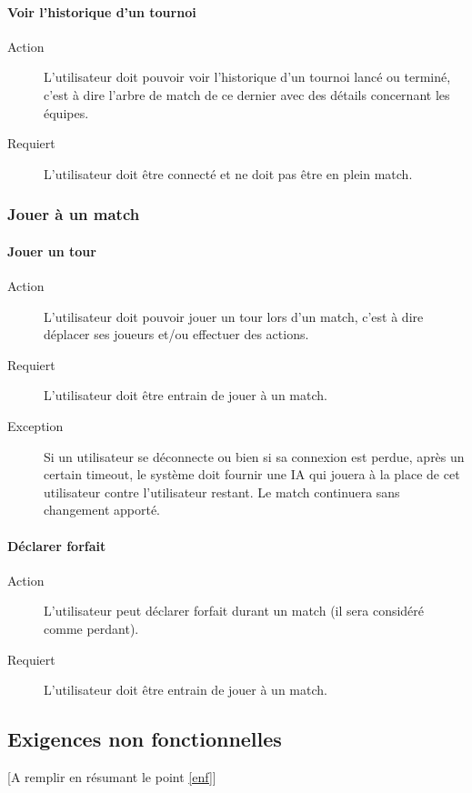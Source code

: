 \documentclass[a4paper]{article}
\begin{document}
\paragraph{Voir l'historique d'un tournoi}
\begin{description}
\item[Action] L'\gls{utilisateur} doit pouvoir voir l'historique d'un tournoi lancé ou terminé, c'est à dire l'arbre de match de ce dernier avec des détails concernant les équipes.
\item[Requiert] L'\gls{utilisateur} doit être connecté et ne doit pas être en plein match.
\end{description}

\subsubsection{Jouer à un match}
\paragraph{Jouer un tour}
\begin{description}
\item[Action] L'\gls{utilisateur} doit pouvoir jouer un tour lors d'un match, c'est à dire déplacer ses joueurs et/ou effectuer des actions.
\item[Requiert] L'utilisateur doit être entrain de jouer à un match.
\item[Exception] Si un \gls{utilisateur} se déconnecte ou bien si sa connexion est perdue, après un certain timeout, le système doit fournir une IA qui jouera à la place de cet \gls{utilisateur} contre l'\gls{utilisateur} restant. Le match continuera sans changement apporté.
\end{description}
\paragraph{Déclarer forfait}
\begin{description}
\item[Action] L'\gls{utilisateur} peut déclarer forfait durant un match (il sera considéré comme perdant).
\item[Requiert] L'utilisateur doit être entrain de jouer à un match.
\end{description}


\subsection{Exigences non fonctionnelles}
[A remplir en résumant le point \ref{enf}]
\end{document}
